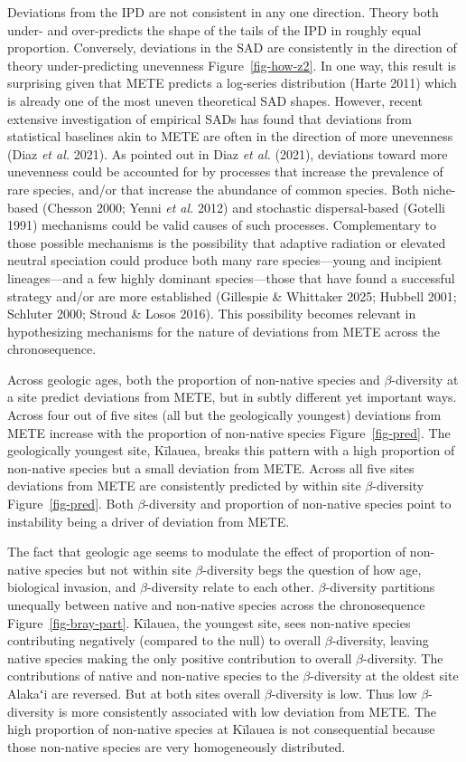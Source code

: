 \documentclass[
  letterpaper,
  DIV=11,
  numbers=noendperiod]{scrartcl}
\begin{document}
Deviations from the IPD are not consistent in any one direction. Theory
both under- and over-predicts the shape of the tails of the IPD in
roughly equal proportion. Conversely, deviations in the SAD are
consistently in the direction of theory under-predicting unevenness
Figure~\ref{fig-how-z2}. In one way, this result is surprising given
that METE predicts a log-series distribution (Harte 2011) which is
already one of the most uneven theoretical SAD shapes. However, recent
extensive investigation of empirical SADs has found that deviations from
statistical baselines akin to METE are often in the direction of more
unevenness (Diaz \emph{et al.} 2021). As pointed out in Diaz \emph{et
al.} (2021), deviations toward more unevenness could be accounted for by
processes that increase the prevalence of rare species, and/or that
increase the abundance of common species. Both niche-based (Chesson
2000; Yenni \emph{et al.} 2012) and stochastic dispersal-based (Gotelli
1991) mechanisms could be valid causes of such processes. Complementary
to those possible mechanisms is the possibility that adaptive radiation
or elevated neutral speciation could produce both many rare
species---young and incipient lineages---and a few highly dominant
species---those that have found a successful strategy and/or are more
established (Gillespie \& Whittaker 2025; Hubbell 2001; Schluter 2000;
Stroud \& Losos 2016). This possibility becomes relevant in
hypothesizing mechanisms for the nature of deviations from METE across
the chronosequence.

Across geologic ages, both the proportion of non-native species and
\(\beta\)-diversity at a site predict deviations from METE, but in
subtly different yet important ways. Across four out of five sites (all
but the geologically youngest) deviations from METE increase with the
proportion of non-native species Figure~\ref{fig-pred}. The geologically
youngest site, Kīlauea, breaks this pattern with a high proportion of
non-native species but a small deviation from METE. Across all five
sites deviations from METE are consistently predicted by within site
\(\beta\)-diversity Figure~\ref{fig-pred}. Both \(\beta\)-diversity and
proportion of non-native species point to instability being a driver of
deviation from METE.

The fact that geologic age seems to modulate the effect of proportion of
non-native species but not within site \(\beta\)-diversity begs the
question of how age, biological invasion, and \(\beta\)-diversity relate
to each other. \(\beta\)-diversity partitions unequally between native
and non-native species across the chronosequence
Figure~\ref{fig-bray-part}. Kīlauea, the youngest site, sees non-native
species contributing negatively (compared to the null) to overall
\(\beta\)-diversity, leaving native species making the only positive
contribution to overall \(\beta\)-diversity. The contributions of native
and non-native species to the \(\beta\)-diversity at the oldest site
Alakaʻi are reversed. But at both sites overall \(\beta\)-diversity is
low. Thus low \(\beta\)-diversity is more consistently associated with
low deviation from METE. The high proportion of non-native species at
Kīlauea is not consequential because those non-native species are very
homogeneously distributed.
\end{document}
